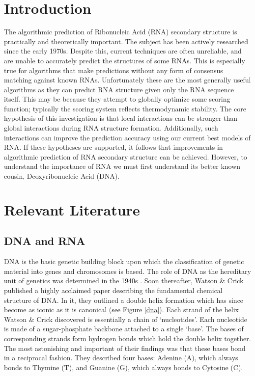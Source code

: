 \documentclass{cshonours}
\begin{document}
\chapter{Introduction}
The algorithmic prediction of Ribonucleic Acid (RNA) secondary structure is practically and theoretically important. The subject has been actively researched since the early 1970s. Despite this, current techniques are often unreliable, and are unable to accurately predict the structures of some RNAs. This is especially true for algorithms that make predictions without any form of consensus matching against known RNAs. Unfortunately these are the most generally useful algorithms as they can predict RNA structure given only the RNA sequence itself. This may be because they attempt to globally optimize some scoring function; typically the scoring system reflects thermodynamic stability. The core hypothesis of this investigation is that local interactions can be stronger than global interactions during RNA structure formation. Additionally, such interactions can improve the prediction accuracy using our current best models of RNA. If these hypotheses are supported, it follows that improvements in algorithmic prediction of RNA secondary structure can be achieved. However, to understand the importance of RNA we must first understand its better known cousin, Deoxyribonucleic Acid (DNA).


\chapter{Relevant Literature}


\section{DNA and RNA}
DNA is the basic genetic building block upon which the classification of genetic material into genes and chromosomes is based. The role of DNA as the hereditary unit of genetics was determined in the 1940s \cite{albertsessential}. Soon thereafter, Watson \& Crick \cite{watson1953molecular} published a highly acclaimed paper describing the fundamental chemical structure of DNA. In it, they outlined a double helix formation which has since become as iconic as it is canonical (see Figure \ref{dna}). Each strand of the helix Watson \& Crick discovered is essentially a chain of `nucleotides'. Each nucleotide is made of a sugar-phosphate backbone attached to a single `base'. The bases of corresponding strands form hydrogen bonds which hold the double helix together. The most astonishing and important of their findings was that these bases bond in a reciprocal fashion. They described four bases: Adenine (A), which always bonds to Thymine (T), and Guanine (G), which always bonds to Cytosine (C).
\end{document}
